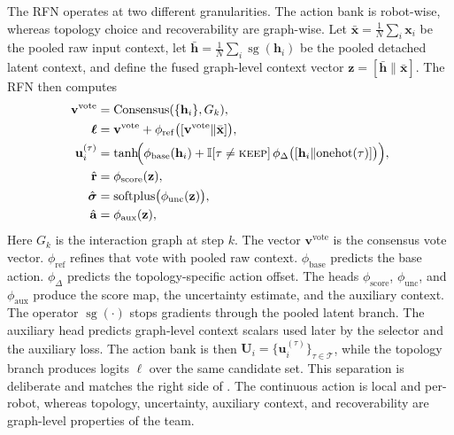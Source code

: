 \documentclass{ieeeaccess}
\newcommand{\cT}{\mathcal{T}}
\newcommand{\bfu}{\mathbf{u}}
\begin{document}
The RFN operates at two different granularities. The action bank is robot-wise, whereas topology choice and recoverability are graph-wise. Let $\bar{\mathbf{x}}=\frac{1}{N}\sum_i \mathbf{x}_i$ be the pooled raw input context, let $\bar{\mathbf{h}}=\frac{1}{N}\sum_i \operatorname{sg}(\mathbf{h}_i)$ be the pooled detached latent context, and define the fused graph-level context vector $\mathbf{z}=[\bar{\mathbf{h}}\|\bar{\mathbf{x}}]$. The RFN then computes
{\small
\begin{equation}
\begin{aligned}
\mathbf{v}^{\mathrm{vote}} &= \mathrm{Consensus}(\{\mathbf{h}_i\}, G_k), \\
\bm{\ell} &= \mathbf{v}^{\mathrm{vote}} + \phi_{\mathrm{ref}}
\bigl([\mathbf{v}^{\mathrm{vote}}\|\bar{\mathbf{x}}]\bigr), \\
\bfu_i^{(\tau)} &= \tanh\!\Bigl(
\phi_{\mathrm{base}}(\mathbf{h}_i) +
\mathbb{I}[\tau \neq \textsc{keep}] \,
\phi_{\Delta}\bigl([\mathbf{h}_i\|\mathrm{onehot}(\tau)]\bigr)
\Bigr), \\
\hat{\mathbf{r}} &= \phi_{\mathrm{score}}(\mathbf{z}), \\
\hat{\bm{\sigma}} &= \mathrm{softplus}\bigl(\phi_{\mathrm{unc}}(\mathbf{z})\bigr), \\
\hat{\mathbf{a}} &= \phi_{\mathrm{aux}}(\mathbf{z}),
\end{aligned}
\label{eq:rfn_heads}
\end{equation}
}
Here $G_k$ is the interaction graph at step $k$.
The vector $\mathbf{v}^{\mathrm{vote}}$ is the consensus vote vector.
$\phi_{\mathrm{ref}}$ refines that vote with pooled raw context.
$\phi_{\mathrm{base}}$ predicts the base action.
$\phi_{\Delta}$ predicts the topology-specific action offset.
The heads $\phi_{\mathrm{score}}$, $\phi_{\mathrm{unc}}$, and
$\phi_{\mathrm{aux}}$ produce the score map, the uncertainty estimate,
and the auxiliary context. The operator $\operatorname{sg}(\cdot)$
stops gradients through the pooled latent branch. The auxiliary head
predicts graph-level context scalars used later by the selector and the
auxiliary loss. The action bank is then
$\mathbf{U}_i=\{\bfu_i^{(\tau)}\}_{\tau\in\cT}$, while the topology
branch produces logits $\bm{\ell}$ over the same candidate set. This
separation is deliberate and matches the right side of .
The continuous action is local and per-robot, whereas topology,
uncertainty, auxiliary context, and recoverability are graph-level
properties of the team.
\end{document}
